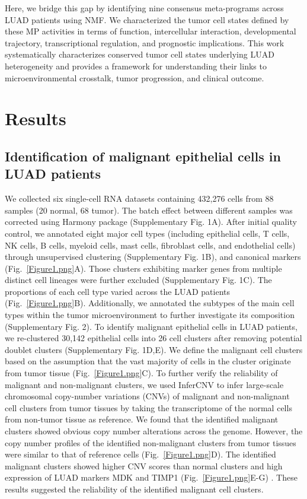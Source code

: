 \documentclass[pdflatex,sn-mathphys-num]{sn-jnl}%
\theoremstyle{thmstyleone}%
\theoremstyle{thmstyletwo}%
\theoremstyle{thmstylethree}%
\begin{document}
Here, we bridge this gap by identifying nine consensus meta-programs across LUAD patients using NMF. We characterized the tumor cell states defined by these MP activities in terms of function, intercellular interaction, developmental trajectory, transcriptional regulation, and prognostic implications. This work systematically characterizes conserved tumor cell states underlying LUAD heterogeneity and provides a framework for understanding their links to microenvironmental crosstalk, tumor progression, and clinical outcome.

\section{Results}\label{sec2}

\subsection{Identification of malignant epithelial cells in LUAD patients}\label{subsec1}

We collected six single-cell RNA datasets containing 432,276 cells from 88 samples (20 normal, 68 tumor). The batch effect between different samples was corrected using Harmony package (Supplementary Fig. 1A). After initial quality control, we annotated eight major cell types (including epithelial cells, T cells, NK cells, B cells, myeloid cells, mast cells, fibroblast cells, and endothelial cells) through unsupervised clustering (Supplementary Fig. 1B), and canonical markers (Fig.~\ref{Figure1.png}A). Those clusters exhibiting marker genes from multiple distinct cell lineages were further excluded (Supplementary Fig. 1C). The proportions of each cell type varied across the LUAD patients (Fig.~\ref{Figure1.png}B). Additionally, we annotated the subtypes of the main cell types within the tumor microenvironment to further investigate its composition (Supplementary Fig. 2).
To identify malignant epithelial cells in LUAD patients, we re-clustered 30,142 epithelial cells into 26 cell clusters after removing potential doublet clusters (Supplementary Fig. 1D,E). We define the malignant cell clusters based on the assumption that the vast majority of cells in the cluster originate from tumor tissue (Fig.~\ref{Figure1.png}C). To further verify the reliability of malignant and non-malignant clusters, we used InferCNV to infer large-scale chromosomal copy-number variations (CNVs) of malignant and non-malignant cell clusters from tumor tissues by taking the transcriptome of the normal cells from non-tumor tissue as reference. We found that the identified malignant clusters showed obvious copy number alterations across the genome. However, the copy number profiles of the identified non-malignant clusters from tumor tissues were similar to that of reference cells (Fig.~\ref{Figure1.png}D). The identified malignant clusters showed higher CNV scores than normal clusters and high expression of LUAD markers MDK and TIMP1 (Fig.~\ref{Figure1.png}E-G) \cite{bib4}. These results suggested the reliability of the identified malignant cell clusters.
\end{document}
